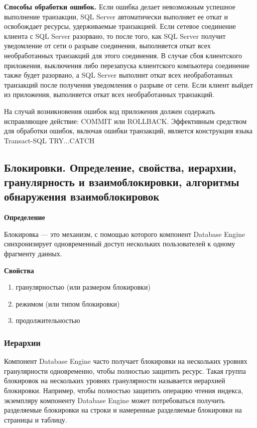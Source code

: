 \textbf{Способы обработки ошибок.}
Если ошибка делает невозможным успешное выполнение транзакции, SQL Server автоматически выполняет ее откат и 
освобождает ресурсы, удерживаемые транзакцией. Если сетевое соединение клиента с SQL Server разорвано, то после  того, как SQL Server получит уведомление от сети о разрыве соединения, выполняется откат всех необработанных транзакций для этого соединения. В случае сбоя клиентского приложения, выключения либо перезапуска клиентского компьютера соединение также будет разорвано, а SQL Server выполнит откат всех необработанных транзакций после получения уведомления о разрыве от сети. Если клиент выйдет из приложения, выполняется откат всех необработанных транзакций.

На случай возникновения ошибок код приложения должен содержать исправляющее действие: COMMIT или 
ROLLBACK. Эффективным средством для обработки ошибок, включая ошибки транзакций, является конструкция языка 
Transact-SQL TRY...CATCH

\newpage

\subsection{Блокировки. Определение, свойства, иерархии, гранулярность и взаимоблокировки, алгоритмы обнаружения взаимоблокировок}

\textbf{Определение}

Блокировка --- это механизм, с помощью которого компонент Database Engine
синхронизирует одновременный доступ нескольких пользователей к одному фрагменту данных.

\textbf{Свойства}

\begin{enumerate}
	\item гранулярностью (или размером блокировки)
	\item режимом (или типом блокировки)
	\item продолжительностью
\end{enumerate}

\subsubsection{Иерархии}

Компонент Database Engine часто получает блокировки на нескольких уровнях гранулярности одновременно, чтобы полностью защитить ресурс. Такая группа блокировок на нескольких уровнях гранулярности называется иерархией блокировки. Например, чтобы полностью защитить операцию чтения индекса, экземпляру компоненту Database Engine может потребоваться получить разделяемые блокировки на строки и намеренные разделяемые блокировки на страницы и таблицу.

